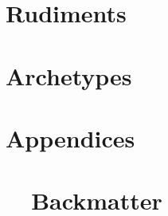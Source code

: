\documentclass[10pt]{newsiambook}
\begin{document}
\frontmatter
%
\tableofcontents
%
\listoffigures
\listoftables
%
%
%

\mainmatter
\part{Rudiments}



\part{Archetypes}




%
\part{Appendices}
\appendix



\part{\ \ Backmatter}
\backmatter
%
%
%
%



\printindex
\end{document}
